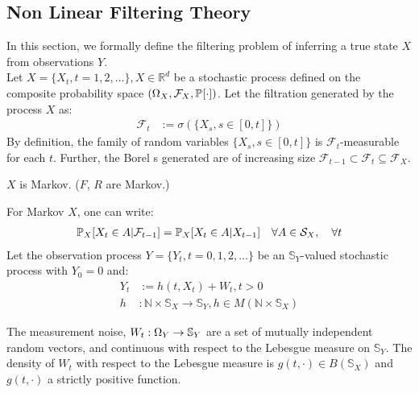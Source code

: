 	

\subsection{Non Linear Filtering Theory}
In this section, we formally define the filtering problem of inferring a true state $X$ from observations $Y$. \\

Let $X = \{X_t, t = 1, 2, \hdots \}, X \in \mathbb{R}^d$ be a stochastic process defined on the composite probability space $(\Omega_{X}, \mathcal{F}_{X}, \mathbb{P}_{{}}{[\cdot]})$. Let the filtration generated by the process $X$ as:
\begin{align}
\mathcal{F}_{t} &:= \sigma(\{X_s, s\in[0, t]\})
\end{align} By definition, the family of random variables $\{X_s, s\in[0, t]\}$ is $\mathcal{F}_{t}$-measurable for each $t$. Further, the Borel \ofield{}s generated  are of increasing size  $\mathcal{F}_{t-1} \subset \mathcal{F}_{t} \subseteq \mathcal{F}_{X}$. 
\begin{azm}
	$X$ is Markov. ($F$, $R$ are Markov.)
\end{azm} For Markov $X$, one can write:
\begin{align}
\mathbb{P}_{X}{[X_{t} \in A |\mathcal{F}_{t-1}]} = \mathbb{P}_{X}{[X_{t} \in A | X_{t-1}]}  \quad \forall A \in \mathcal{S}_X, \quad \forall t
\end{align}
Let the observation process $Y = \{Y_t, t= 0, 1, 2, \hdots\} $ be an $\mathbb{S}_Y$-valued stochastic process with $Y_0 = 0$ and:
\begin{align}
Y_t & := h(t, X_t) + W_t, t>0 \\
h &:  \mathbb{N} \times \mathbb{S}_X \to \mathbb{S}_Y, h \in M(\mathbb{N} \times \mathbb{S}_X )
\end{align}
\begin{azm}
The measurement noise, $W_t: \Omega_{Y} \to \mathbb{S}_Y $ are a set of mutually independent random vectors, and continuous with respect to the {\color{red} Lebesgue measure} on $\mathbb{S}_Y $. The density of $W_t$ with respect to the Lebesgue measure is $g(t, \cdot) \in B(\mathbb{S}_X)$ and $g(t, \cdot)$ a strictly positive function. 
\end{azm}
